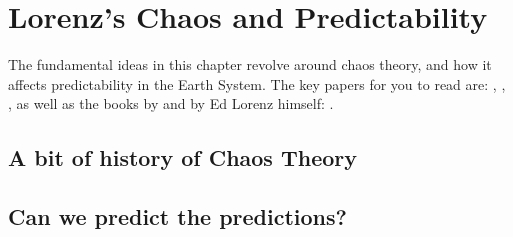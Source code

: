 \chapter{Lorenz's Chaos and Predictability}

The fundamental ideas in this chapter revolve around chaos theory, and how it affects predictability in the Earth System.
The key papers for you to read are: \cite{lorenz:63}, \cite{lorenz:69}, \cite{Vallis:86}, as well as the books by \cite{Gleick-book} and by Ed Lorenz himself: \cite{Lorenz-book}.

\section{A bit of history of Chaos Theory}

\section{Can we predict the predictions?}
